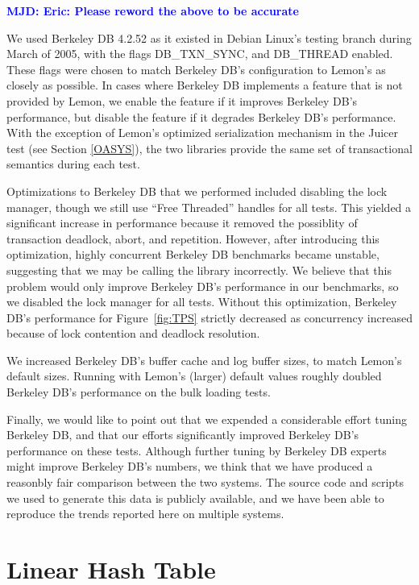 \documentclass[letterpaper,twocolumn,english]{article}
\newcommand{\yad}{Lemon\xspace}
\newcommand{\oasys}{Juicer\xspace}
\newcommand{\mjd}[1]{\textcolor{blue}{\bf MJD: #1}}
\begin{document}
\mjd{Eric: Please reword the above to be accurate}

We used Berkeley DB 4.2.52 as it existed in Debian Linux's testing
branch during March of 2005, with the flags DB\_TXN\_SYNC, and DB\_THREAD
enabled. These flags were chosen to match 
Berkeley DB's configuration to \yad's as closely as possible.  In cases where
Berkeley DB implements a feature that is not provided by \yad, we
enable the feature if it improves Berkeley DB's performance, but
disable the feature if it degrades Berkeley DB's performance.  With 
the exception of \yad's optimized serialization mechanism in the 
\oasys test (see Section \ref{OASYS}), 
the two libraries provide the same set of transactional 
semantics during each test.  

Optimizations to Berkeley DB that we performed included disabling the
lock manager, though we still use ``Free Threaded'' handles for all tests.
This yielded a significant increase in performance because it removed
the possiblity of transaction deadlock, abort, and repetition.
However, after introducing this optimization, highly concurrent Berkeley
DB benchmarks became unstable, suggesting that we may be calling the
library incorrectly.  We believe that this problem would only improve
Berkeley DB's performance in our benchmarks, so we
disabled the lock manager for all tests.  Without this optimization,
Berkeley DB's performance for Figure~\ref{fig:TPS} strictly decreased as
concurrency increased because of lock contention and deadlock resolution.

We increased Berkeley DB's buffer cache and log buffer sizes, to match
\yad's default sizes.  Running with \yad's (larger) default values
roughly doubled Berkeley DB's performance on the bulk loading tests.

Finally, we would like to point out that we expended a considerable
effort tuning Berkeley DB, and that our efforts significantly
improved Berkeley DB's performance on these tests.  Although further
tuning by Berkeley DB experts might improve Berkeley DB's
numbers, we think that we have produced a reasonbly fair comparison
between the two systems.  The source code and scripts we used to
generate this data is publicly available, and we have been able to
reproduce the trends reported here on multiple systems.


\section{Linear Hash Table\label{sub:Linear-Hash-Table}}
\end{document}
